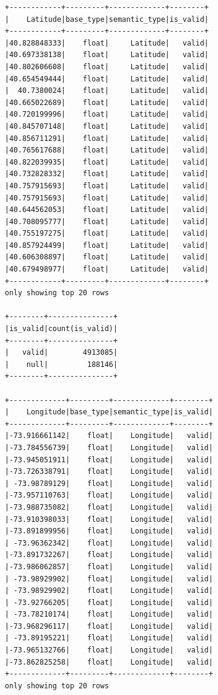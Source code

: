 \documentclass{article}
\begin{document}
\begin{itemize}
\begin{verbatim}
+------------+---------+-------------+--------+
|    Latitude|base_type|semantic_type|is_valid|
+------------+---------+-------------+--------+
|40.828848333|    float|     Latitude|   valid|
|40.697338138|    float|     Latitude|   valid|
|40.802606608|    float|     Latitude|   valid|
|40.654549444|    float|     Latitude|   valid|
|  40.7380024|    float|     Latitude|   valid|
|40.665022689|    float|     Latitude|   valid|
|40.720199996|    float|     Latitude|   valid|
|40.845707148|    float|     Latitude|   valid|
|40.856711291|    float|     Latitude|   valid|
|40.765617688|    float|     Latitude|   valid|
|40.822039935|    float|     Latitude|   valid|
|40.732828332|    float|     Latitude|   valid|
|40.757915693|    float|     Latitude|   valid|
|40.757915693|    float|     Latitude|   valid|
|40.644562053|    float|     Latitude|   valid|
|40.708095777|    float|     Latitude|   valid|
|40.755197275|    float|     Latitude|   valid|
|40.857924499|    float|     Latitude|   valid|
|40.606308897|    float|     Latitude|   valid|
|40.679498977|    float|     Latitude|   valid|
+------------+---------+-------------+--------+
only showing top 20 rows

+--------+---------------+
|is_valid|count(is_valid)|
+--------+---------------+
|   valid|        4913085|
|    null|         188146|
+--------+---------------+

+-------------+---------+-------------+--------+
|    Longitude|base_type|semantic_type|is_valid|
+-------------+---------+-------------+--------+
|-73.916661142|    float|    Longitude|   valid|
|-73.784556739|    float|    Longitude|   valid|
|-73.945051911|    float|    Longitude|   valid|
|-73.726338791|    float|    Longitude|   valid|
| -73.98789129|    float|    Longitude|   valid|
|-73.957110763|    float|    Longitude|   valid|
|-73.988735082|    float|    Longitude|   valid|
|-73.910398033|    float|    Longitude|   valid|
|-73.891899956|    float|    Longitude|   valid|
| -73.96362342|    float|    Longitude|   valid|
|-73.891732267|    float|    Longitude|   valid|
|-73.986062857|    float|    Longitude|   valid|
| -73.98929902|    float|    Longitude|   valid|
| -73.98929902|    float|    Longitude|   valid|
| -73.92766205|    float|    Longitude|   valid|
| -73.78210174|    float|    Longitude|   valid|
|-73.968296117|    float|    Longitude|   valid|
| -73.89195221|    float|    Longitude|   valid|
|-73.965132766|    float|    Longitude|   valid|
|-73.862825258|    float|    Longitude|   valid|
+-------------+---------+-------------+--------+
only showing top 20 rows


\end{verbatim}
\end{itemize}
\end{document}
